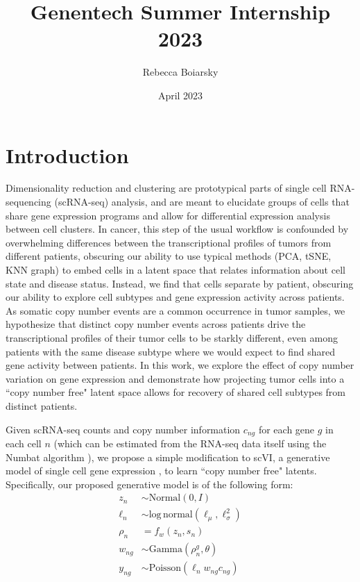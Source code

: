 \documentclass{article}
\title{Genentech Summer Internship 2023}
\author{Rebecca Boiarsky}
\date{April 2023}
\begin{document}
\maketitle

\section{Introduction}

Dimensionality reduction and clustering are prototypical parts of single cell RNA-sequencing (scRNA-seq) analysis, and are meant to elucidate groups of cells that share gene expression programs and allow for differential expression analysis between cell clusters. In cancer, this step of the usual workflow is confounded by overwhelming differences between the transcriptional profiles of tumors from different patients, obscuring our ability to use typical methods (PCA, tSNE, KNN graph) to embed cells in a latent space that relates information about cell state and disease status. Instead, we find that cells separate by patient, obscuring our ability to explore cell subtypes and gene expression activity across patients. As somatic copy number events are a common occurrence in tumor samples, we hypothesize that distinct copy number events across patients drive the transcriptional profiles of their tumor cells to be starkly different, even among patients with the same disease subtype where we would expect to find shared gene activity between patients. In this work, we explore the effect of copy number variation on gene expression and demonstrate how projecting tumor cells into a ``copy number free" latent space allows for recovery of shared cell subtypes from distinct patients.

Given scRNA-seq counts and copy number information $c_{ng}$ for each gene $g$ in each cell $n$ (which can be estimated from the RNA-seq data itself using the Numbat algorithm \citep{gao2023haplotype}), we propose a simple modification to scVI, a generative model of single cell gene expression \citep{lopez2018deep}, to learn ``copy number free" latents. Specifically, our proposed generative model is of the following form:\\
\begin{align}%
{z_n} & {\sim {\mathrm{Normal}}\left( {0,I} \right)} \\ 
{\ell _n} & {\sim {\mathrm{log}}\,{\mathrm{normal}}\left( {\ell _\mu ,\ell _\sigma ^2} \right)} \\ 
{\rho _n} & { = f_w\left( {z_n,s_n} \right)} \\ 
{w_{ng}} & {\sim {\mathrm{Gamma}}\left( {\rho _n^g,\theta } \right)} \\ 
{y_{ng}} & {\sim {\mathrm{Poisson}}\left( {\ell _nw_{ng}c_{ng}} \right)}
\end{align}
\end{document}
